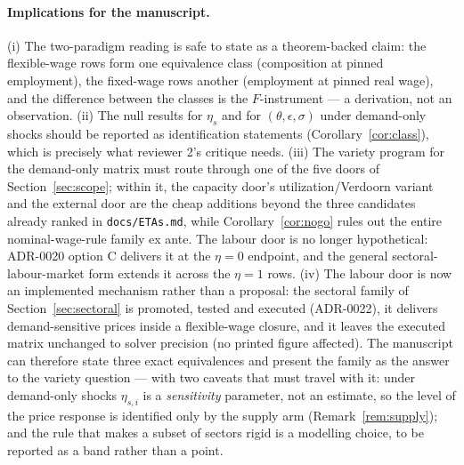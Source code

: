 \paragraph{Implications for the manuscript.} (i) The two-paradigm reading
is safe to state as a theorem-backed claim: the flexible-wage rows form one
equivalence class (composition at pinned employment), the fixed-wage rows
another (employment at pinned real wage), and the difference between the
classes is the $F$-instrument --- a derivation, not an observation.
(ii) The null results for $\eta_s$ and for $(\theta,\epsilon,\sigma)$ under
demand-only shocks should be reported as identification statements
(Corollary~\ref{cor:class}), which is precisely what reviewer 2's critique
needs. (iii) The variety program for the demand-only matrix must route
through one of the five doors of Section~\ref{sec:scope}; within it, the
capacity door's utilization/Verdoorn variant and the external door are the
cheap additions beyond the three candidates already ranked in
\texttt{docs/ETAs.md}, while Corollary~\ref{cor:nogo} rules out the entire
nominal-wage-rule family ex ante. The labour door is
no longer hypothetical: ADR-0020 option C delivers it at the $\eta = 0$
endpoint, and the general sectoral-labour-market form extends it across the
$\eta = 1$ rows.
(iv) The labour door is now an implemented mechanism
rather than a proposal: the sectoral family of Section~\ref{sec:sectoral} is
promoted, tested and executed (ADR-0022), it delivers demand-sensitive prices
inside a flexible-wage closure, and it leaves the executed matrix
unchanged to solver precision (no printed figure
affected). The manuscript can therefore state three exact equivalences and
present the family as the answer to the variety question --- with two caveats
that must travel with it: under demand-only shocks $\eta_{s,i}$ is a
\emph{sensitivity} parameter, not an estimate, so the level of the price
response is identified only by the supply arm (Remark~\ref{rem:supply}); and
the rule that makes a subset of sectors rigid is a modelling choice, to be
reported as a band rather than a point.
